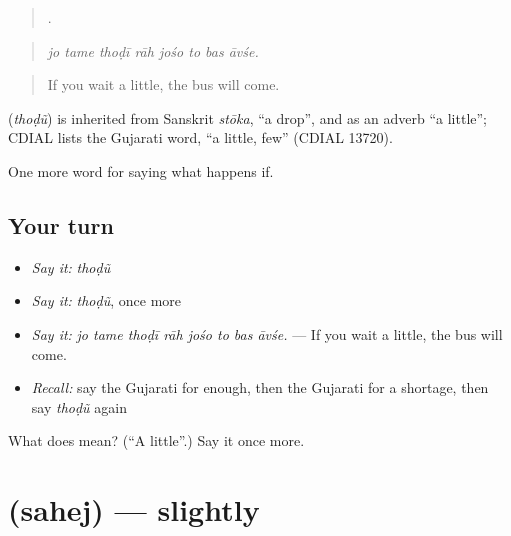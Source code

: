 \begin{quote}
       .
\end{quote}

\begin{quote}
\emph{jo tame thoḍī rāh jośo to bas āvśe.}
\end{quote}

\begin{quote}
If you wait a little, the bus will come.
\end{quote}

\begin{cousinweb}
\textbf{} (\emph{thoḍũ}) is inherited from Sanskrit \emph{stōka}, \textquotedblleft{}a drop\textquotedblright{}, and as an adverb \textquotedblleft{}a little\textquotedblright{}; CDIAL lists the Gujarati word, \textquotedblleft{}a little, few\textquotedblright{} (CDIAL 13720).
\end{cousinweb}

\begin{grammarlens}[title={What you've built}]
One more word for saying what happens if.
\end{grammarlens}

\subsection*{Your turn}
\begin{itemize}
\raggedright
  \item \emph{Say it:} \emph{thoḍũ}
  \item \emph{Say it:} \emph{thoḍũ}, once more
  \item \emph{Say it:} \emph{jo tame thoḍī rāh jośo to bas āvśe.} — If you wait a little, the bus will come.
  \item \emph{Recall:} say the Gujarati for enough, then the Gujarati for a shortage, then say \emph{thoḍũ} again
\end{itemize}

\begin{tcolorbox}[breakable,colback=teal!4,colframe=teal!35!black,title={Before you move on}]
What does  mean? (\textquotedblleft{}A little\textquotedblright{}.) Say it once more.
\end{tcolorbox}
\section[\texorpdfstring{\gu{સહેજ} (sahej)}{સહેજ (sahej)}]{ (sahej) — slightly}

